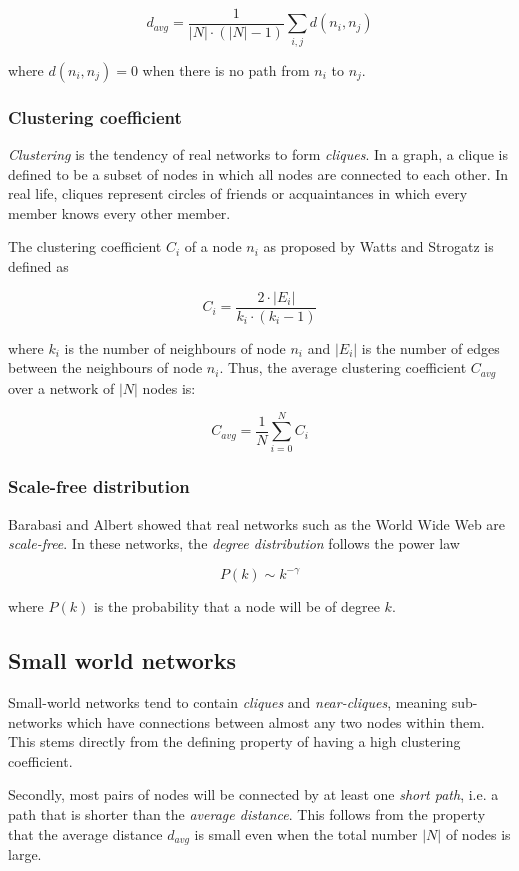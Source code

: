 \documentclass[a4paper,11pt,titlepage]{article}
\begin{document}
\[ d_{avg} = \frac{1}{|N| \cdot (|N| - 1)} \sum_{i, j} d(n_i, n_j) \]

where $d(n_i, n_j) = 0$ when there is no path from $n_i$ to $n_j$.

\subsubsection{Clustering coefficient}
\label{sec:clusteringcoefficient}

\emph{Clustering} is the tendency of real networks to form
\emph{cliques}. In a graph, a clique is defined to be a subset of
nodes in which all nodes are connected to each other.
In real life, cliques represent circles of friends
or acquaintances in which every member knows every other member.

The clustering coefficient $C_i$ of a node $n_i$ as proposed by
Watts and Strogatz is defined as

\[ C_i = \frac{2 \cdot |E_i|}{k_i \cdot (k_i-1)} \]

where $k_i$ is the number of neighbours of node $n_i$ and $|E_i|$ is
the number of edges between the neighbours of node $n_i$. Thus, the
average clustering coefficient $C_{avg}$ over a network of $|N|$
nodes is:

\[ C_{avg} = \frac{1}{N}\sum_{i=0}^{N} C_i \]

\subsubsection{Scale-free distribution}
\label{sec:scale-free}

Barabasi and Albert showed that real networks such as the World Wide Web
are \emph{scale-free}. In these networks, the \emph{degree distribution}
follows the power law

\[ P(k) \sim k^{-\gamma} \]

where $P(k)$ is the probability that a node will be of degree $k$.


\subsection{Small world networks}

Small-world networks tend to contain \emph{cliques} and
\emph{near-cliques}, meaning sub-networks which have connections
between almost any two nodes within them. This stems directly from
the defining property of having a high clustering coefficient.

Secondly, most pairs of nodes will be connected by at least one
\emph{short path}, i.e. a path that is shorter than the
\emph{average distance}.
This follows from the property that the average distance $d_{avg}$
is small even when the total number $|N|$ of nodes is large.
\end{document}

